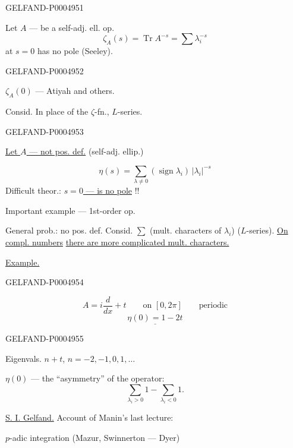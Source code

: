 \begin{GelfandAdjacentEvidence}{GELFAND-P000495}{1}

  

Let $A$ — be a self-adj. ell. op.
\[
\zeta_A(s)=\operatorname{Tr}A^{-s}=\sum\lambda_i^{-s}
\]
at $s=0$ has no pole (Seeley).
\end{GelfandAdjacentEvidence}
\begin{GelfandAdjacentEvidence}{GELFAND-P000495}{2}


$\zeta_A(0)$ — Atiyah and others.

Consid. In place of the $\zeta$-fn., $L$-series.
\end{GelfandAdjacentEvidence}
\begin{GelfandAdjacentEvidence}{GELFAND-P000495}{3}


\begin{flushright}\small \uline{Let \mbox{$A$} — not pos. def.} (self-adj. ellip.)\end{flushright}
\[
\eta(s)=\sum_{\lambda\ne0}(\operatorname{sign}\lambda_i)\,|\lambda_i|^{-s}
\]
Difficult theor.: \uline{\mbox{$s=0$} — is no pole} !!

Important example — 1st-order op.

General prob.: no pos. def. Consid.
$\sum$ (mult. characters of $\lambda_i$)
($L$-series).
\uline{On compl. numbers} \uline{there are more complicated mult. characters.}

\uline{Example.}
\end{GelfandAdjacentEvidence}
\begin{GelfandAdjacentEvidence}{GELFAND-P000495}{4}

\[
 A=i\frac{d}{dx}+t\qquad\text{on }[0,2\pi]\qquad\text{periodic}
\]
\[
\underline{\eta(0)=1-2t}
\]
\end{GelfandAdjacentEvidence}
\begin{GelfandAdjacentEvidence}{GELFAND-P000495}{5}


Eigenvals. $n+t$, $n=-2,-1,0,1,\ldots$

$\eta(0)$ — the “asymmetry” of the operator:
\[
\sum_{\lambda_i>0}1-\sum_{\lambda_i<0}1.
\]

\uline{S. I. Gelfand.} Account of Manin’s last lecture:

$p$-adic integration (Mazur, Swinnerton — Dyer)
\end{GelfandAdjacentEvidence}



